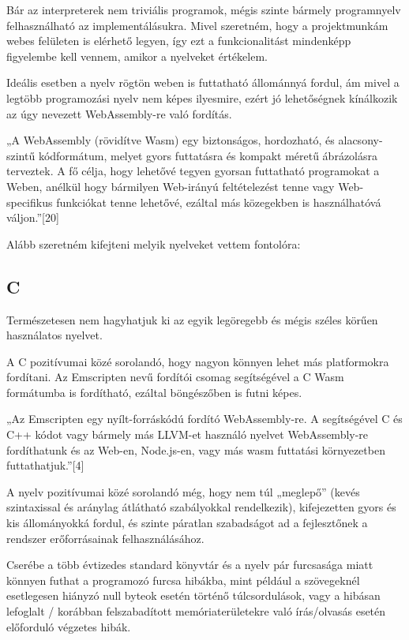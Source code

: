 Bár az interpreterek nem triviális programok, mégis szinte bármely programnyelv felhasználható az implementálásukra. Mivel szeretném, hogy a projektmunkám webes felületen is elérhető legyen, így ezt a funkcionalitást mindenképp figyelembe kell vennem, amikor a nyelveket értékelem.

Ideális esetben a nyelv rögtön weben is futtatható állománnyá fordul, ám mivel a legtöbb programozási nyelv nem képes ilyesmire, ezért jó lehetőségnek kínálkozik az úgy nevezett WebAssembly-re való fordítás.

„A WebAssembly (rövidítve Wasm) egy biztonságos, hordozható, és alacsony-szintű kódformátum, melyet gyors futtatásra és kompakt méretű ábrázolásra terveztek. A fő célja, hogy lehetővé tegyen gyorsan futtatható programokat a Weben, anélkül hogy bármilyen Web-irányú feltételezést tenne vagy Web-specifikus funkciókat tenne lehetővé, ezáltal más közegekben is használhatóvá váljon.”[20]

Alább szeretném kifejteni melyik nyelveket vettem fontolóra:

\newpage

\subsection{C}

Természetesen nem hagyhatjuk ki az egyik legöregebb és mégis széles körűen használatos nyelvet.

A C pozitívumai közé sorolandó, hogy nagyon könnyen lehet más platformokra fordítani. Az Emscripten nevű fordítói csomag segítségével a C Wasm formátumba is fordítható, ezáltal böngészőben is futni képes.

„Az Emscripten egy nyílt-forráskódú fordító WebAssembly-re. A segítségével C és C++ kódot vagy bármely más LLVM-et használó nyelvet WebAssembly-re fordíthatunk és az Web-en, Node.js-en, vagy más wasm futtatási környezetben futtathatjuk.”[4]

A nyelv pozitívumai közé sorolandó még, hogy nem túl „meglepő” (kevés szintaxissal és aránylag átlátható szabályokkal rendelkezik), kifejezetten gyors és kis állományokká fordul, és szinte páratlan szabadságot ad a fejlesztőnek a rendszer erőforrásainak felhasználásához.

Cserébe a több évtizedes standard könyvtár és a nyelv pár furcsasága miatt könnyen futhat a programozó furcsa hibákba, mint például a szövegeknél esetlegesen hiányzó null byteok esetén történő túlcsordulások, vagy a hibásan lefoglalt / korábban felszabadított memóriaterületekre való írás/olvasás esetén előforduló végzetes hibák.

